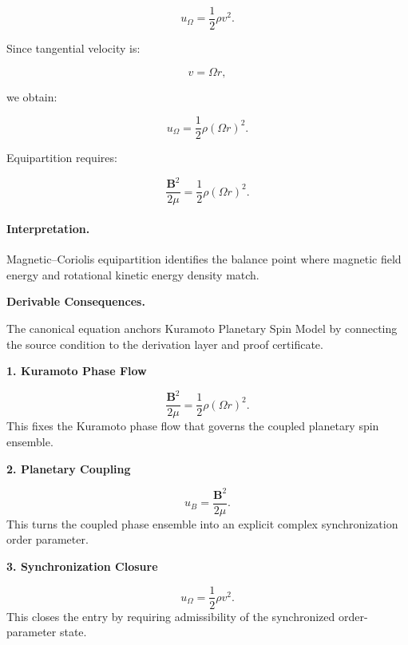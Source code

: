 \begin{equation}
u_{\Omega}
=
\frac{1}{2}\rho v^2 .
\end{equation}

Since tangential velocity is:

\begin{equation}
v=\Omega r,
\end{equation}

we obtain:

\begin{equation}
u_{\Omega}
=
\frac{1}{2}\rho(\Omega r)^2 .
\end{equation}

Equipartition requires:

\begin{equation}
\boxed{
\frac{\mathbf{B}^2}{2\mu}
=
\frac{1}{2}\rho(\Omega r)^2 .
}
\end{equation}

\paragraph{Interpretation.}
Magnetic--Coriolis equipartition identifies the balance point where magnetic field energy and rotational kinetic energy density match.

\par\vspace{0.35em}
\noindent\textbf{Derivable Consequences.}\quad
\begingroup
\footnotesize
\raggedright
The canonical equation anchors Kuramoto Planetary Spin Model by connecting the source condition to the derivation layer and proof certificate.
\par\endgroup

\noindent\textbf{1. Kuramoto Phase Flow}\par
\[
\frac{\mathbf{B}^2}{2\mu} = \frac{1}{2}\rho(\Omega r)^2.
\]
\noindent This fixes the Kuramoto phase flow that governs the coupled planetary spin ensemble.\par
\noindent\textbf{2. Planetary Coupling}\par
\[
u_B = \frac{\mathbf{B}^2}{2\mu}.
\]
\noindent This turns the coupled phase ensemble into an explicit complex synchronization order parameter.\par
\noindent\textbf{3. Synchronization Closure}\par
\[
u_{\Omega} = \frac{1}{2}\rho v^2.
\]
\noindent This closes the entry by requiring admissibility of the synchronized order-parameter state.\par

